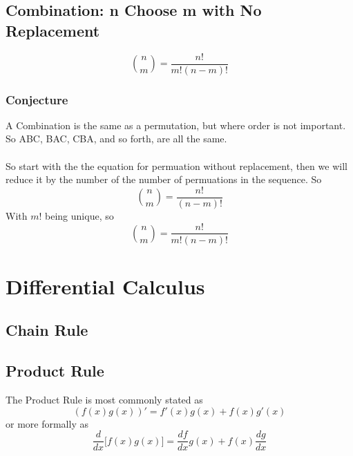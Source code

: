 \documentclass[11pt]{book}
\begin{document}
\section{ Combination: n Choose m with No Replacement}
\[{n \choose m} = \frac{n!}{m!(n-m)!}\]

\subsection{Conjecture}
A Combination is the same as a permutation, but where order is not important.  So ABC, BAC, CBA, and so forth, are all the same.\\
\\
So start with the the equation for permuation without replacement, then we will reduce it by the number of the number of permuations in the sequence. So\\
\[{n \choose m} = \frac{n!}{(n-m)!}\]
With \(m!\) being unique, so\\
\[{n \choose m} = \frac{n!}{m!(n-m)!}\]

\chapter{Differential Calculus}

\section{Chain Rule}

\section{Product Rule}
The Product Rule is most commonly stated as
\[(f(x)g(x))' = f'(x)g(x) + f(x)g'(x)\]
or more formally as
\[\frac{d}{dx}\bigg[f(x)g(x) \bigg] = \frac{df}{dx}g(x) + f(x)\frac{dg}{dx} \]
\end{document}
